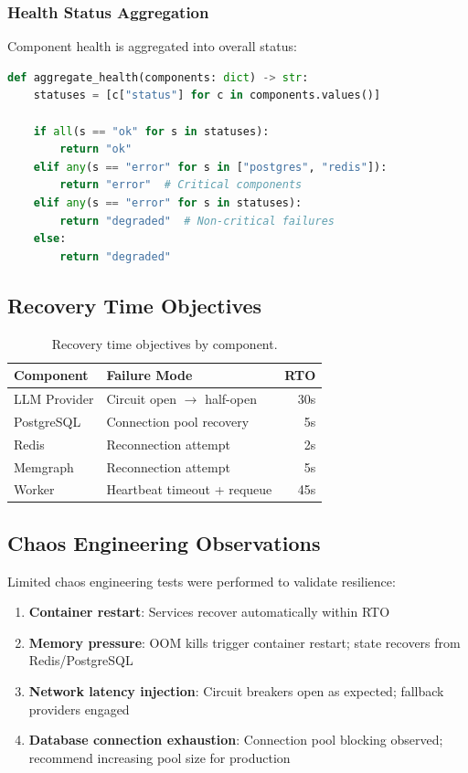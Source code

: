 \subsubsection{Health Status Aggregation}

Component health is aggregated into overall status:

\begin{lstlisting}[language=Python,caption={Health status aggregation logic.}]
def aggregate_health(components: dict) -> str:
    statuses = [c["status"] for c in components.values()]
    
    if all(s == "ok" for s in statuses):
        return "ok"
    elif any(s == "error" for s in ["postgres", "redis"]):
        return "error"  # Critical components
    elif any(s == "error" for s in statuses):
        return "degraded"  # Non-critical failures
    else:
        return "degraded"
\end{lstlisting}

\subsection{Recovery Time Objectives}

\begin{table}[ht]
\centering
\caption{Recovery time objectives by component.}
\label{tab:rto}
\small
\begin{tabular}{llr}
\hline
\textbf{Component} & \textbf{Failure Mode} & \textbf{RTO} \\
\hline
LLM Provider & Circuit open $\rightarrow$ half-open & 30s \\
PostgreSQL & Connection pool recovery & 5s \\
Redis & Reconnection attempt & 2s \\
Memgraph & Reconnection attempt & 5s \\
Worker & Heartbeat timeout + requeue & 45s \\
\hline
\end{tabular}
\end{table}

\subsection{Chaos Engineering Observations}

Limited chaos engineering tests were performed to validate resilience:

\begin{enumerate}
    \item \textbf{Container restart}: Services recover automatically within RTO
    \item \textbf{Memory pressure}: OOM kills trigger container restart; state recovers from Redis/PostgreSQL
    \item \textbf{Network latency injection}: Circuit breakers open as expected; fallback providers engaged
    \item \textbf{Database connection exhaustion}: Connection pool blocking observed; recommend increasing pool size for production
\end{enumerate}

